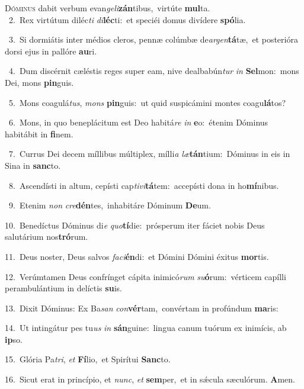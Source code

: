 \lettrine{\initial\textcolor{\initialcolor}{D}}{óminus} dabit verbum evan\-\textit{ge}\-\textit{li}\textbf{zán}tibus,~\star virtúte \textbf{mul}\-ta.\\
{\numbfont\textcolor{\numbcolor}{~2.}}~Rex virtútum diléc\textit{ti} \textit{di}\-\textbf{léc}ti:~\star et speciéi domus divídere \textbf{spó}\-lia.\par
{\numbfont\textcolor{\numbcolor}{~3.}}~Si dormiátis inter médios cleros, pennæ colúmbæ de\-\textit{ar}\-\textit{gen}\textbf{tá}tæ,~\star et posterióra dorsi ejus in pallóre \textbf{au}\-ri.\par
{\numbfont\textcolor{\numbcolor}{~4.}}~Dum discérnit cæléstis reges super eam, nive dealbabún\textit{tur} \textit{in} \textbf{Sel}\-mon:~\star mons Dei, mons \textbf{pin}\-guis.\par
{\numbfont\textcolor{\numbcolor}{~5.}}~Mons coagulá\-\textit{tus}\-, \textit{mons} \textbf{pin}\-guis:~\star ut quid suspicámini montes coagu\-\textbf{lá}\-tos?\par
{\numbfont\textcolor{\numbcolor}{~6.}}~Mons, in quo beneplácitum est Deo habitá\textit{re} \textit{in} \textbf{e}\-o:~\star étenim Dóminus habitábit in \textbf{fi}\-nem.\par
{\numbfont\textcolor{\numbcolor}{~7.}}~Currus Dei decem míllibus múltiplex, mílli\textit{a} \textit{læ}\-\textbf{tán}tium:~\star Dóminus in eis in Sina in \textbf{sanc}\-to.\par
{\numbfont\textcolor{\numbcolor}{~8.}}~Ascendísti in altum, cepísti cap\-\textit{ti}\-\textit{vi}\textbf{tá}tem:~\star accepísti dona in ho\-\textbf{mí}\-nibus.\par
{\numbfont\textcolor{\numbcolor}{~9.}}~Etenim \textit{non} \textit{cre}\-\textbf{dén}tes,~\star inhabitáre Dóminum \textbf{De}\-um.\par
{\numbfont\textcolor{\numbcolor}{10.}}~Benedíctus Dóminus di\textit{e} \textit{quo}\-\textbf{tí}die:~\star prósperum iter fáciet nobis Deus salutárium nos\-\textbf{tró}\-rum.\par
{\numbfont\textcolor{\numbcolor}{11.}}~Deus noster, Deus salvos \textit{fa}\-\textit{ci}\textbf{én}di:~\star et Dómini Dómini éxitus \textbf{mor}\-tis.\par
{\numbfont\textcolor{\numbcolor}{12.}}~Verúmtamen Deus confrínget cápita inimicó\textit{rum} \textit{su}\-\textbf{ó}rum:~\star vérticem capílli perambulántium in delíctis \textbf{su}\-is.\par
{\numbfont\textcolor{\numbcolor}{13.}}~Dixit Dóminus: Ex Ba\textit{san} \textit{con}\-\textbf{vér}tam,~\star convértam in profúndum \textbf{ma}\-ris:\par
{\numbfont\textcolor{\numbcolor}{14.}}~Ut intingátur pes tu\textit{us} \textit{in} \textbf{sán}\-guine:~\star lingua canum tuórum ex inimícis, ab \textbf{ip}\-so.\par
{\numbfont\textcolor{\numbcolor}{15.}}~Glória Pa\-\textit{tri}\-, \textit{et} \textbf{Fí}\-lio,~\star et Spirítui \textbf{Sanc}\-to.\par
{\numbfont\textcolor{\numbcolor}{16.}}~Sicut erat in princípio, et \textit{nunc}\-, \textit{et} \textbf{sem}\-per,~\star et in sǽcula sæculórum. \textbf{A}\-men.\par

